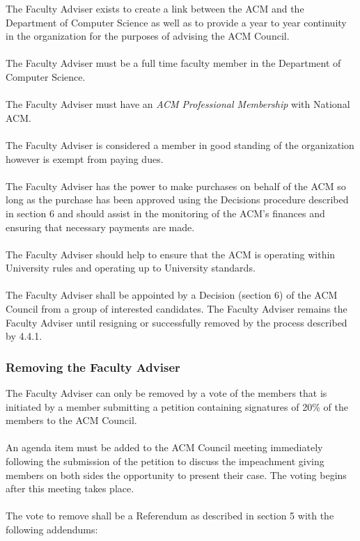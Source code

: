 \documentclass[12pt,titlepage]{article}
\begin{document}
The Faculty Adviser exists to create a link between the ACM and the Department of Computer Science as well as to provide a year to year continuity in the organization for the purposes of advising the ACM Council.\\
\\
The Faculty Adviser must be a full time faculty member in the Department of Computer Science.\\
\\
The Faculty Adviser must have an \emph{ACM Professional Membership} with National ACM.\\
\\
The Faculty Adviser is considered a member in good standing of the organization however is exempt from paying dues.\\
\\
The Faculty Adviser has the power to make purchases on behalf of the ACM so long as the purchase has been approved using the Decisions procedure described in section 6 and should assist in the monitoring of the ACM's finances and ensuring that necessary payments are made.\\
\\
The Faculty Adviser should help to ensure that the ACM is operating within University rules and operating up to University standards.\\
\\
The Faculty Adviser shall be appointed by a Decision (section 6) of the ACM Council from a group of interested candidates. The Faculty Adviser remains the Faculty Adviser until resigning or successfully removed by the process described by 4.4.1.

\subsubsection{Removing the Faculty Adviser}
The Faculty Adviser can only be removed by a vote of the members that is initiated by a member submitting a petition containing signatures of 20\% of the members to the ACM Council.\\
\\
An agenda item must be added to the ACM Council meeting immediately following the submission of the petition to discuss the impeachment giving members on both sides the opportunity to present their case. The voting begins after this meeting takes place.\\
\\
The vote to remove shall be a Referendum as described in section 5 with the following addendums:
\end{document}
